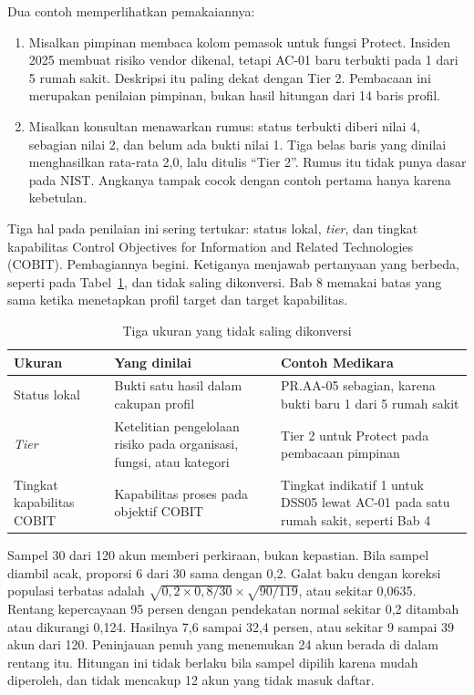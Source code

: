 Dua contoh memperlihatkan pemakaiannya:
\begin{enumerate}
  \item Misalkan pimpinan membaca kolom pemasok untuk fungsi Protect. Insiden 2025 membuat risiko
  vendor dikenal, tetapi AC-01 baru terbukti pada 1 dari 5 rumah sakit. Deskripsi itu paling dekat
  dengan Tier 2. Pembacaan ini merupakan penilaian pimpinan, bukan hasil hitungan dari 14 baris
  profil.
  \item Misalkan konsultan menawarkan rumus: status terbukti diberi nilai 4, sebagian nilai 2, dan
  belum ada bukti nilai 1. Tiga belas baris yang dinilai menghasilkan rata-rata 2,0, lalu ditulis
  ``Tier 2''. Rumus itu tidak punya dasar pada NIST. Angkanya tampak cocok dengan contoh pertama
  hanya karena kebetulan.
\end{enumerate}

Tiga hal pada penilaian ini sering tertukar: status lokal, \textit{tier}, dan tingkat kapabilitas
Control Objectives for Information and Related Technologies (COBIT). Pembagiannya begini. Ketiganya
menjawab pertanyaan yang berbeda, seperti pada Tabel~\ref{tab:ch06-tiga-ukuran}, dan tidak saling
dikonversi. Bab 8 memakai batas yang sama ketika menetapkan profil target dan target kapabilitas.

\begin{table}[!htb]
  \centering\small
  \caption{Tiga ukuran yang tidak saling dikonversi}\label{tab:ch06-tiga-ukuran}
  \begin{tabularx}{\textwidth}{|>{\raggedright\arraybackslash}p{}|>{\raggedright\arraybackslash}X|>{\raggedright\arraybackslash}X|}
    \hline
    \textbf{Ukuran} & \textbf{Yang dinilai} & \textbf{Contoh Medikara} \\ \hline
    Status lokal & Bukti satu hasil dalam cakupan profil & PR.AA-05 sebagian, karena bukti baru 1
    dari 5 rumah sakit \\ \hline
    \textit{Tier} & Ketelitian pengelolaan risiko pada organisasi, fungsi, atau kategori & Tier 2
    untuk Protect pada pembacaan pimpinan \\ \hline
    Tingkat kapabilitas COBIT & Kapabilitas proses pada objektif COBIT & Tingkat indikatif 1 untuk
    DSS05 lewat AC-01 pada satu rumah sakit, seperti Bab 4 \\ \hline
  \end{tabularx}
\end{table}

\begin{pendalaman}
Sampel 30 dari 120 akun memberi perkiraan, bukan kepastian. Bila sampel diambil acak, proporsi 6
dari 30 sama dengan 0,2. Galat baku dengan koreksi populasi terbatas adalah
$\sqrt{0{,}2 \times 0{,}8 / 30} \times \sqrt{90 / 119}$, atau sekitar 0,0635. Rentang kepercayaan 95
persen dengan pendekatan normal sekitar 0,2 ditambah atau dikurangi 0,124. Hasilnya 7,6 sampai 32,4
persen, atau sekitar 9 sampai 39 akun dari 120. Peninjauan penuh yang menemukan 24 akun berada di
dalam rentang itu. Hitungan ini tidak berlaku bila sampel dipilih karena mudah diperoleh, dan tidak
mencakup 12 akun yang tidak masuk daftar.
\end{pendalaman}

